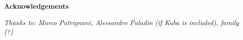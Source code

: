 \thispagestyle{empty}

\begin{center}
    {\bf \Huge Acknowledgements}
\end{center}

\vspace{4cm}

\emph{
    Thanks to: Marco Patrignani, Alessandro Paladin (if Kuba is included), family (?)
}

